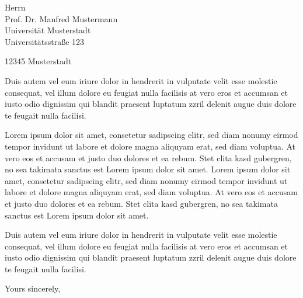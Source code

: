 \documentclass[foldmarks,rightdate,twoside,a4paper]{hhuletter}
\begin{document}
\begin{letter}{Herrn\\
Prof. Dr. Manfred Mustermann\\
Universität Musterstadt\\
Universitätsstraße 123

12345 Musterstadt}
Duis autem vel eum iriure dolor in hendrerit in vulputate velit esse
molestie consequat, vel illum dolore eu feugiat nulla facilisis at vero eros
et accumsan et iusto odio dignissim qui blandit praesent luptatum zzril
delenit augue duis dolore te feugait nulla facilisi. 

Lorem ipsum dolor sit amet, consetetur sadipscing elitr, sed diam nonumy
eirmod tempor invidunt ut labore et dolore magna aliquyam erat, sed diam
voluptua. At vero eos et accusam et justo duo dolores et ea rebum. Stet
clita kasd gubergren, no sea takimata sanctus est Lorem ipsum dolor sit
amet. Lorem ipsum dolor sit amet, consetetur sadipscing elitr, sed diam
nonumy eirmod tempor invidunt ut labore et dolore magna aliquyam erat, sed
diam voluptua. At vero eos et accusam et justo duo dolores et ea rebum. Stet
clita kasd gubergren, no sea takimata sanctus est Lorem ipsum dolor sit
amet.   

Duis autem vel eum iriure dolor in hendrerit in vulputate velit esse
molestie consequat, vel illum dolore eu feugiat nulla facilisis at vero eros
et accumsan et iusto odio dignissim qui blandit praesent luptatum zzril
delenit augue duis dolore te feugait nulla facilisi. 


\closing{Yours sincerely,}

\end{letter}
\end{document}
